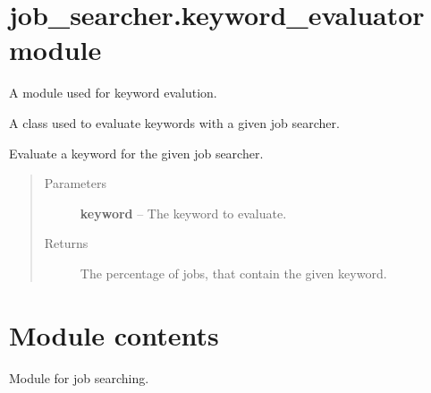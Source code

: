 \documentclass[letterpaper,10pt,english]{sphinxmanual}
\begin{document}
\section{job\_searcher.keyword\_evaluator module}
\label{job_searcher:module-job_searcher.keyword_evaluator}\label{job_searcher:job-searcher-keyword-evaluator-module}
A module used for keyword evalution.

\begin{fulllineitems}
\label{job_searcher:job_searcher.keyword_evaluator.KeywordEvaluator}
A class used to evaluate keywords with a given job searcher.

\begin{fulllineitems}
\label{job_searcher:job_searcher.keyword_evaluator.KeywordEvaluator.evaluate_keyword}
Evaluate a keyword for the given job searcher.
\begin{quote}\begin{description}
\item[{Parameters}] \leavevmode
\textbf{keyword} -- The keyword to evaluate.

\item[{Returns}] \leavevmode
The percentage of jobs, that contain the given keyword.

\end{description}\end{quote}

\end{fulllineitems}


\end{fulllineitems}



\section{Module contents}
\label{job_searcher:module-job_searcher}\label{job_searcher:module-contents}
Module for job searching.
\end{document}
